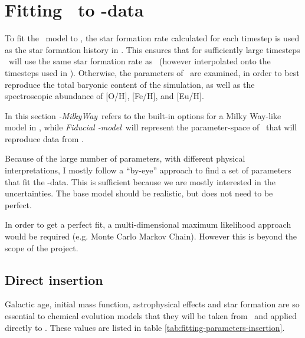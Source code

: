 \section{Fitting \omegamodel\ to \eris-data}
\setlength{}
\newcommand\mwomega{\textit{\omegamodel-MilkyWay}}
\newcommand\mwcomega{\textit{\omegamodel-MilkyWay-c.sfr.}}
\newcommand\vanillaomega{\textit{Vanilla \omegamodel-model}}
\newcommand\fiduccialomega{\textit{Fiducial \omegamodel-model}}

To fit the \omegamodel\ model to \eris, the star formation rate calculated for each timestep is used as the star formation history in \omegamodel.
This ensures that for sufficiently large timesteps \omegamodel\ will use the same star formation rate as \eris\ (however interpolated onto the timesteps used in \omegamodel).
Otherwise, the parameters of \omegamodel\ are examined, in order to best reproduce the total baryonic content of the simulation, as well as the spectroscopic abundance of [O/H], [Fe/H], and [Eu/H].

In this section \mwomega\ refers to the built-in options for a Milky Way-like model in \omegamodel, while \fiduccialomega\ will represent the parameter-space of \omegamodel\ that will reproduce data from \eris.

Because of the large number of parameters, with different physical interpretations, I mostly follow a ``by-eye'' approach to find a set of parameters that fit the \eris-data.
This is sufficient because we are mostly interested in the uncertainties. The base model should be realistic, but does not need to be perfect.

In order to get a perfect fit, a multi-dimensional maximum likelihood approach would be required (e.g.  Monte Carlo Markov Chain).
However this is beyond the scope of the project.

\subsection{Direct insertion}
\newcommand\insertion{direct insertion}
Galactic age, initial mass function, astrophysical effects and star formation are so essential to chemical evolution models that they will be taken from \eris\ and applied directly to \omegamodel.
These values are listed in table \ref{tab:fitting-parameters-insertion}.

